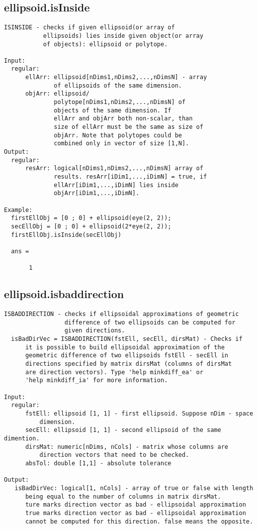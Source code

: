 \subsection{\texorpdfstring{ellipsoid.isInside}{isInside}}\label{method:ellipsoid.isInside}
\begin{verbatim}
ISINSIDE - checks if given ellipsoid(or array of
           ellipsoids) lies inside given object(or array
           of objects): ellipsoid or polytope.

Input:
  regular:
      ellArr: ellipsoid[nDims1,nDims2,...,nDimsN] - array
              of ellipsoids of the same dimension.
      objArr: ellipsoid/
              polytope[nDims1,nDims2,...,nDimsN] of
              objects of the same dimension. If
              ellArr and objArr both non-scalar, than
              size of ellArr must be the same as size of
              objArr. Note that polytopes could be
              combined only in vector of size [1,N].
Output:
  regular:
      resArr: logical[nDims1,nDims2,...,nDimsN] array of
              results. resArr[iDim1,...,iDimN] = true, if
              ellArr[iDim1,...,iDimN] lies inside
              objArr[iDim1,...,iDimN].

Example:
  firstEllObj = [0 ; 0] + ellipsoid(eye(2, 2));
  secEllObj = [0 ; 0] + ellipsoid(2*eye(2, 2));
  firstEllObj.isInside(secEllObj)

  ans =

       1
\end{verbatim}
\subsection{\texorpdfstring{ellipsoid.isbaddirection}{isbaddirection}}\label{method:ellipsoid.isbaddirection}
\begin{verbatim}
ISBADDIRECTION - checks if ellipsoidal approximations of geometric
                 difference of two ellipsoids can be computed for
                 given directions.
  isBadDirVec = ISBADDIRECTION(fstEll, secEll, dirsMat) - Checks if
      it is possible to build ellipsoidal approximation of the
      geometric difference of two ellipsoids fstEll - secEll in
      directions specified by matrix dirsMat (columns of dirsMat
      are direction vectors). Type 'help minkdiff_ea' or
      'help minkdiff_ia' for more information.

Input:
  regular:
      fstEll: ellipsoid [1, 1] - first ellipsoid. Suppose nDim - space
          dimension.
      secEll: ellipsoid [1, 1] - second ellipsoid of the same dimention.
      dirsMat: numeric[nDims, nCols] - matrix whose columns are
          direction vectors that need to be checked.
      absTol: double [1,1] - absolute tolerance

Output:
   isBadDirVec: logical[1, nCols] - array of true or false with length
      being equal to the number of columns in matrix dirsMat.
      ture marks direction vector as bad - ellipsoidal approximation
      true marks direction vector as bad - ellipsoidal approximation
      cannot be computed for this direction. false means the opposite.
\end{verbatim}

